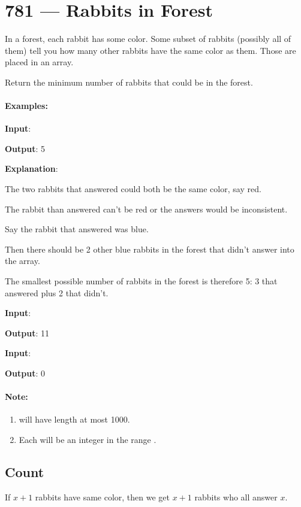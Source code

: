 \section{781 --- Rabbits in Forest}
In a forest, each rabbit has some color. Some subset of rabbits (possibly all of them) tell you how many other rabbits have the same color as them. Those  are placed in an array.

Return the minimum number of rabbits that could be in the forest.

\paragraph{Examples:}
\begin{flushleft}


\textbf{Input}: 

\textbf{Output}: 5

\textbf{Explanation}:

The two rabbits that answered  could both be the same color, say red.

The rabbit than answered  can't be red or the answers would be inconsistent.

Say the rabbit that answered  was blue.

Then there should be 2 other blue rabbits in the forest that didn't answer into the array.

The smallest possible number of rabbits in the forest is therefore 5: 3 that answered plus 2 that didn't.

\textbf{Input}: 

\textbf{Output}: 11

\textbf{Input}: 

\textbf{Output}: 0
\end{flushleft}

\paragraph{Note:}

\begin{enumerate}
\item {} will have length at most 1000.
\item Each  will be an integer in the range \fcj{[0, 999]}.
\end{enumerate}

\subsection{Count}
If $ x+1 $ rabbits have same color, then we get $ x+1 $ rabbits who all answer $ x $.

